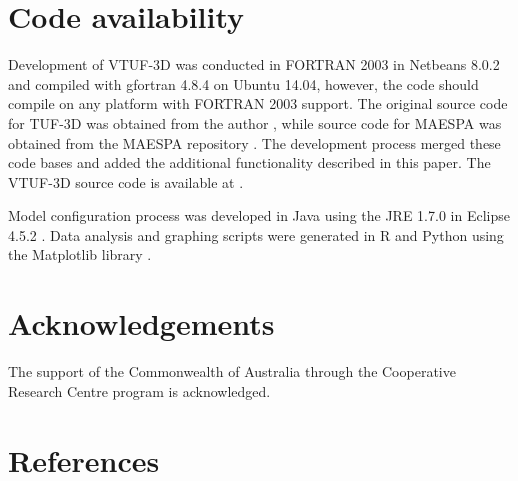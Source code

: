 \documentclass[final,3p,times,authoryear]{elsarticle}
\begin{document}
\section{Code availability}\label{sec:available}

Development of VTUF-3D was conducted in FORTRAN 2003 \citep{GNU2016a} in Netbeans 8.0.2 \citep{Netbeans2016} and compiled with gfortran 4.8.4 \citep{GNU2016} on Ubuntu 14.04, however, the code should compile on any platform with FORTRAN 2003 support. The original source code for TUF-3D was obtained from the author \citep{Krayenhoff2007}, while source code for MAESPA was obtained from the MAESPA repository \citep{Duursma2016}. The development process merged these code bases and added the additional functionality described in this paper. The VTUF-3D source code is available at \cite{Nice2016c}.

Model configuration process was developed in Java using the JRE 1.7.0 \citep{Oracle2016} in Eclipse 4.5.2 \citep{Eclipse2016}. Data analysis and graphing scripts were generated in R \citep{R2013} and Python \citep{Python2016} using the Matplotlib library \citep{Hunter2007}. 

\section*{Acknowledgements}
The support of the Commonwealth of Australia through the Cooperative Research Centre program is acknowledged.

\section*{References}\label{sec:ref}
   
  


\begin{thebibliography}{00}


\bibitem[ ()]{}

\end{thebibliography}


\appendix
\setcounter{table}{0}
\renewcommand{\thetable}{A\arabic{table}}
\end{document}
